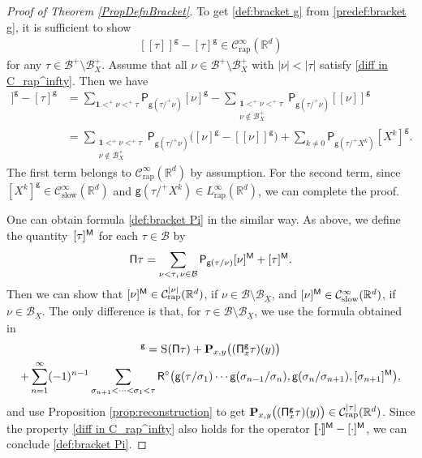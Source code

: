 \documentclass[JEP,XML,SOM,Unicode,published]{cedram}
\theoremstyle{plain}
\theoremstyle{definition}
\newcommand{\unit}{\mathbf{1}}
\newcommand{\Brac}[1]{[\![#1]\!]}
\newcommand{\rap}{\mathrm{rap}}
\newcommand{\slow}{\mathrm{slow}}
\newcommand{\bfP}{\mathbf{P}}
\newcommand{\sfP}{\mathsf{P}}
\newcommand{\sfR}{\mathsf{R}}
\newcommand{\sfg}{\mathsf{g}}
\newcommand{\bbR}{\mathbb{R}}
\newcommand{\mcB}{\mathcal{B}}
\newcommand{\mcC}{\mathcal{C}}
\begin{document}
\begin{proof}[Proof of Theorem \ref{PropDefnBracket}]
To get \eqref{def:bracket g} from \eqref{predef:bracket g}, it is sufficient to show
\begin{align}\label{diff in C_rap^infty}
\Brac{\tau}^\sfg-[\tau]^\sfg\in \mcC_\rap^\infty(\bbR^d)
\end{align}
for any $\tau\in\mcB^+\setminus\mcB_X^+$. Assume that all $\nu\in\mcB^+\setminus\mcB_X^+$ with $|\nu|<|\tau|$ satisfy \eqref{diff in C_rap^infty}. Then we have
\begin{align*}
\Brac{\tau}^\sfg-[\tau]^\sfg &= \sum_{\unit<^+\nu<^+\tau}\sfP_{\sfg(\tau/^+\nu)}[\nu]^\sfg-\sum_{\substack{\unit<^+\nu<^+\tau\\\nu\notin\mcB_X^+}}\sfP_{\sfg(\tau/^+\nu)}\Brac{\nu}^\sfg \\
&= \sum_{\substack{\unit<^+\nu<^+\tau\\\nu\notin\mcB_X^+}}\sfP_{\sfg(\tau/^+\nu)}\bigl([\nu]^\sfg-\Brac{\nu}^\sfg\bigr) + \sum_{k\neq0}\sfP_{\sfg(\tau/^+X^k)}[X^k]^\sfg.
\end{align*}
The first term belongs to $\mcC_\rap^\infty(\bbR^d)$ by assumption. For the second term, since $[X^k]^\sfg\in \mcC_\slow^\infty(\bbR^d)$ and $\sfg(\tau/^+X^k)\in L_\rap^\infty(\bbR^d)$, we can complete the proof.

One can obtain formula \eqref{def:bracket Pi} in the similar way. As above, we define the quantity~$[\tau]^{\sf M}$ for each $\tau\in\mcB$ by
\begin{align*}
{\sf\Pi}\tau=\sum_{\nu<\tau,\, \nu\in\mcB}\sfP_{\sfg(\tau/\nu)}[\nu]^{\sf M}+[\tau]^{\sf M}.
\end{align*}
Then we can show that $[\nu]^{\sf M}\in \mcC_\rap^{|\nu|}(\bbR^d)$, if $\nu\in\mcB\setminus\mcB_{\underline{X}}$, and $[\nu]^{\sf M}\in \mcC_\slow^\infty(\bbR^d)$, if $\nu\in\mcB_{\underline{X}}$.
The only difference is that, for $\tau\in\mcB\setminus\mcB_{\underline{X}}$, we use the formula obtained in~\cite{BH}
\begin{multline*}
[\tau]^\sfg = \textsc{S}({\sf\Pi}\tau)+\bfP_{x,y}\bigl(({\sf\Pi}_x^{\sfg}\tau)(y)\bigr) \\
+ \sum_{n=1}^\infty(-1)^{n-1}\sum_{\sigma_{n+1}<\cdots<\sigma_1<\tau} {\sfR}^\circ\bigl(\sfg(\tau/\sigma_1)\cdots\sfg(\sigma_{n-1}/\sigma_n),\sfg(\sigma_n/\sigma_{n+1}),[\sigma_{n+1}]^{\sf M}\bigr),
\end{multline*}
and use Proposition \ref{prop:reconstruction} to get $\bfP_{x,y}\bigl(({\sf\Pi}_x^{\sf g}\tau)(y)\bigr)\in \mcC_\rap^{|\tau|}(\bbR^d)$.
Since the property \eqref{diff in C_rap^infty} also holds for the operator $\Brac{\cdot}^{\sf M}-[\cdot]^{\sf M}$, we can conclude \eqref{def:bracket Pi}.
\end{proof}
\end{document}
